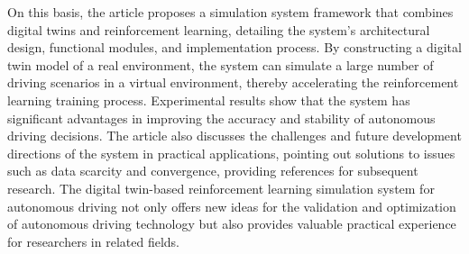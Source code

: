 \begin{abstracten}
    On this basis, the article proposes a simulation system framework that combines digital twins and 
    reinforcement learning, detailing the system's architectural design, functional modules, and 
    implementation process. By constructing a digital twin model of a real environment, the system can 
    simulate a large number of driving scenarios in a virtual environment, thereby accelerating the 
    reinforcement learning training process. Experimental results show that the system has significant 
    advantages in improving the accuracy and stability of autonomous driving decisions. The article also 
    discusses the challenges and future development directions of the system in practical applications, 
    pointing out solutions to issues such as data scarcity and convergence, providing references for 
    subsequent research. The digital twin-based reinforcement learning simulation system for autonomous 
    driving not only offers new ideas for the validation and optimization of autonomous driving technology 
    but also provides valuable practical experience for researchers in related fields.

\end{abstracten}